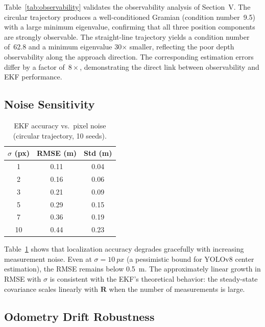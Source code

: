 \documentclass[journal]{IEEEtran}
\newcommand{\vR}{\mathbf{R}}
\begin{document}
Table~\ref{tab:observability} validates the observability analysis of Section~V.
The circular trajectory produces a well-conditioned Gramian (condition number~9.5) with a large minimum eigenvalue, confirming that all three position components are strongly observable.
The straight-line trajectory yields a condition number of~62.8 and a minimum eigenvalue 30$\times$ smaller, reflecting the poor depth observability along the approach direction.
The corresponding estimation errors differ by a factor of~$8\times$, demonstrating the direct link between observability and EKF performance.

\subsection{Noise Sensitivity}

\begin{table}[t]
\centering
\caption{EKF accuracy vs.\ pixel noise (circular trajectory, 10 seeds).}
\label{tab:noise}
\begin{tabular}{@{}ccc@{}}
\toprule
$\sigma$ \textbf{(px)} & \textbf{RMSE (m)} & \textbf{Std (m)} \\
\midrule
1  & 0.11 & 0.04 \\
2  & 0.16 & 0.06 \\
3  & 0.21 & 0.09 \\
5  & 0.29 & 0.15 \\
7  & 0.36 & 0.19 \\
10 & 0.44 & 0.23 \\
\bottomrule
\end{tabular}
\end{table}

Table~\ref{tab:noise} shows that localization accuracy degrades gracefully with increasing measurement noise.
Even at $\sigma = \SI{10}{px}$ (a pessimistic bound for YOLOv8 center estimation), the RMSE remains below \SI{0.5}{m}.
The approximately linear growth in RMSE with $\sigma$ is consistent with the EKF's theoretical behavior: the steady-state covariance scales linearly with $\vR$ when the number of measurements is large.

\subsection{Odometry Drift Robustness}
\end{document}
